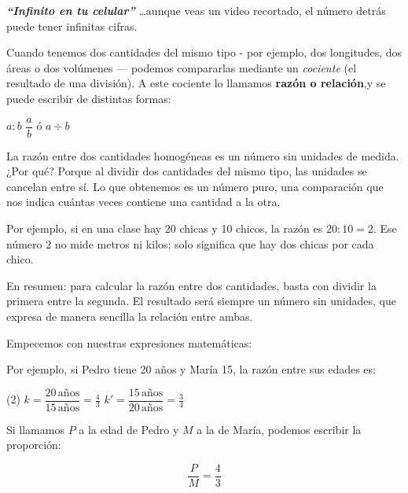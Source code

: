 \begin{capitulobox}
\textbf{\textit{``Infinito en tu celular''}} \ldots aunque veas un video recortado, 
el número detrás puede tener infinitas cifras.
\end{capitulobox}


Cuando tenemos dos cantidades del mismo tipo - por ejemplo, dos longitudes, 
dos áreas o dos volúmenes — podemos compararlas mediante un \textit{cociente}
(el resultado de una división).
A este cociente lo llamamos \textbf{razón o relación},y se puede escribir de distintas formas:

\begin{center}
$a : b$ \qquad $\dfrac{a}{b}$ \qquad ó \qquad $a \div b$
\end{center}

La razón entre dos cantidades homogéneas es un número sin unidades de medida.
¿Por qué? Porque al dividir dos cantidades del mismo tipo, las unidades se cancelan entre sí.
Lo que obtenemos es un número puro, una comparación que nos indica cuántas
veces contiene una cantidad a la otra.

Por ejemplo, si en una clase hay 20 chicas y 10 chicos, la razón es $20:10 = 2$.
Ese número 2 no mide metros ni kilos; solo significa que hay dos chicas por cada chico.

En resumen: para calcular la razón entre dos cantidades, basta con dividir la primera entre la segunda.
El resultado será siempre un número sin unidades, que expresa de manera sencilla la relación entre ambas.

Empecemos con nuestras expresiones matemáticas:

Por ejemplo, si Pedro tiene 20 años y María 15, la razón entre sus edades
es:

\noindent {}

\begin{ejemplos2shortbull}(2)
  \task $k  = \dfrac{20\,\text{años}}{15\,\text{años}} = \tfrac{4}{3}$
  \task $k' = \dfrac{15\,\text{años}}{20\,\text{años}} = \tfrac{3}{4}$
\end{ejemplos2shortbull}

Si llamamos $P$ a la edad de Pedro y $M$ a la de María, podemos escribir la
proporción:

\[
\dfrac{P}{M} = \dfrac{4}{3} 
\]



